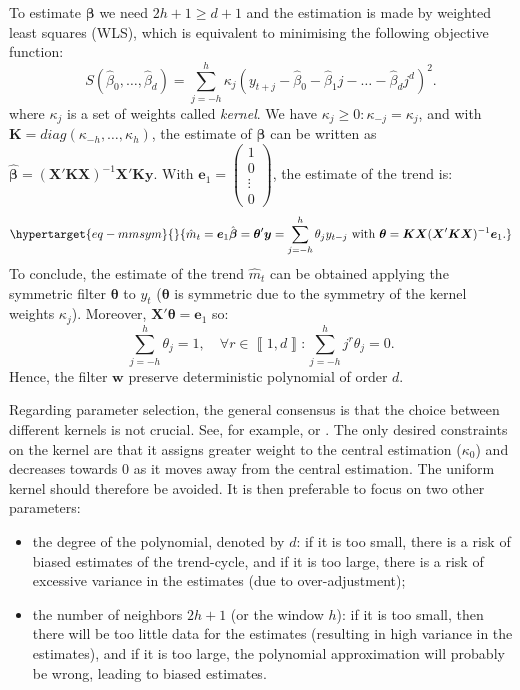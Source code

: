 \documentclass[
]{article}
\newcommand\1{\mathds{1}}
\begin{document}
To estimate \(\boldsymbol \beta\) we need \(2h+1\geq d+1\) and the
estimation is made by weighted least squares (WLS), which is equivalent
to minimising the following objective function: \[
S(\hat{\beta}_{0},\dots,\hat{\beta}_{d})=\sum_{j=-h}^{h}\kappa_{j}(y_{t+j}-\hat{\beta}_{0}-\hat{\beta}_{1}j-\dots-\hat{\beta}_{d}j^{d})^{2}.
\] where \(\kappa_j\) is a set of weights called \emph{kernel}. We have
\(\kappa_j\geq 0:\kappa_{-j}=\kappa_j\), and with
\(\boldsymbol K=diag(\kappa_{-h},\dots,\kappa_{h})\), the estimate of
\(\boldsymbol \beta\) can be written as
\(\hat{\boldsymbol\beta}=(\boldsymbol X'\boldsymbol K\boldsymbol X)^{-1}\boldsymbol X'\boldsymbol K\boldsymbol y.\)
With \(\boldsymbol e_1=\begin{pmatrix}1 \\0 \\\vdots\\0 \end{pmatrix}\),
the estimate of the trend is:
\begin{equation}\protect\hypertarget{eq-mmsym}{}{
\hat{m}_{t}=\boldsymbol e_{1}\hat{\boldsymbol \beta}=\boldsymbol \theta'\boldsymbol y=\sum_{j=-h}^{h}\theta_{j}y_{t-j}\text{ with }\boldsymbol \theta=\boldsymbol K\boldsymbol X(\boldsymbol X'\boldsymbol K\boldsymbol X)^{-1}\boldsymbol e_{1}.
}\label{eq-mmsym}\end{equation} To conclude, the estimate of the trend
\(\hat{m}_{t}\) can be obtained applying the symmetric filter
\(\boldsymbol \theta\) to \(y_t\) (\(\boldsymbol \theta\) is symmetric
due to the symmetry of the kernel weights \(\kappa_j\)). Moreover,
\(\boldsymbol X'\boldsymbol \theta=\boldsymbol e_{1}\) so: \[
\sum_{j=-h}^{h}\theta_{j}=1,\quad\forall r\in\left\llbracket 1,d\right\rrbracket:\sum_{j=-h}^{h}j^{r}\theta_{j}=0.
\] Hence, the filter \(\boldsymbol w\) preserve deterministic polynomial
of order \(d\).

Regarding parameter selection, the general consensus is that the choice
between different kernels is not crucial. See, for example,
\textcite{cleveland1996smoothing} or \textcite{Loader1999}. The only
desired constraints on the kernel are that it assigns greater weight to
the central estimation (\(\kappa_0\)) and decreases towards 0 as it
moves away from the central estimation. The uniform kernel should
therefore be avoided. It is then preferable to focus on two other
parameters:

\begin{itemize}
\item
  the degree of the polynomial, denoted by \(d\): if it is too small,
  there is a risk of biased estimates of the trend-cycle, and if it is
  too large, there is a risk of excessive variance in the estimates (due
  to over-adjustment);
\item
  the number of neighbors \(2h+1\) (or the window \(h\)): if it is too
  small, then there will be too little data for the estimates (resulting
  in high variance in the estimates), and if it is too large, the
  polynomial approximation will probably be wrong, leading to biased
  estimates.
\end{itemize}
\end{document}
